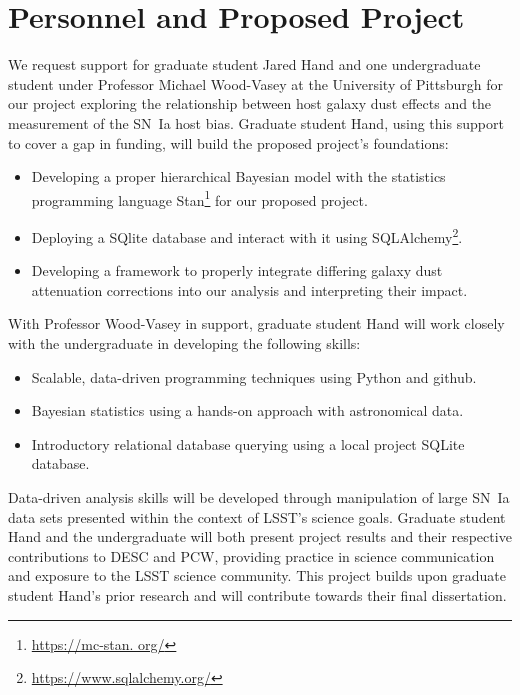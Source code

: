 \documentclass[modern]{aastex63}
\begin{document}
\section{Personnel and Proposed Project}
We request support for graduate student Jared Hand and one undergraduate student under Professor Michael Wood-Vasey at the University of Pittsburgh for our project exploring the relationship between host galaxy dust effects and the measurement of the SN~Ia host bias.
Graduate student Hand, using this support to cover a gap in funding, will build the proposed project's foundations:
\begin{itemize}
    \item Developing a proper hierarchical Bayesian model with the statistics programming language Stan\footnote{\url{https://mc-stan.
    org/}} for our proposed project.
    \item Deploying a SQlite database and interact with it using SQLAlchemy\footnote{\url{https://www.sqlalchemy.org/}}.
    \item Developing a framework to properly integrate differing galaxy dust attenuation corrections into our analysis and interpreting their impact.
\end{itemize}
With Professor Wood-Vasey in support, graduate student Hand will work closely with the undergraduate in developing the following skills:
\begin{itemize}
    \item Scalable, data-driven programming techniques using Python and github.
    \item Bayesian statistics using a hands-on approach with astronomical data. 
    \item Introductory relational database querying using a local project SQLite database.
\end{itemize}
Data-driven analysis skills will be developed through manipulation of large SN~Ia data sets presented within the context of LSST's science goals.
Graduate student Hand and the undergraduate will both present project results and their respective contributions to DESC and PCW, providing practice in science communication and exposure to the LSST science community.
This project builds upon graduate student Hand's prior research \citep{Hand2021} and will contribute towards their final dissertation.
\end{document}
